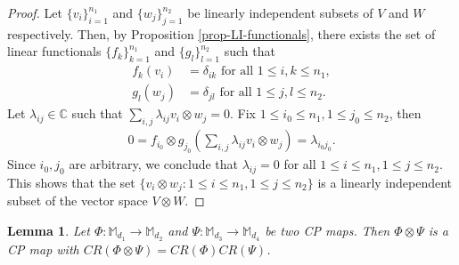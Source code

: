 \documentclass[10pt,reqno]{amsart}
\theoremstyle{definition}
\theoremstyle{plain}
\newtheorem{lem}[defn]{Lemma}
\theoremstyle{remark}
\newcommand{\mbb}[1]{\mathbb{#1}}
\newcommand{\msc}[1]{\mathscr{#1}}
\newcommand{\M}[1]{\mbb{M}_{#1}}%
\numberwithin{equation}{section}%
\begin{document}
   
   \begin{proof}
   	Let $\{v_i\}_{i=1}^{n_1}$ and $\{w_j\}_{j=1}^{n_2}$ be linearly independent subsets of $V$ and $W$ respectively. Then, by Proposition \ref{prop-LI-functionals}, there exists the set of linear functionals $\{f_k\}_{k=1}^{n_1}$ and $\{g_l\}_{l=1}^{n_2}$ such that 
   	\begin{align*}
   		f_k(v_i)&=\delta_{ik} \mbox{ for all } 1\leq i,k\leq n_1,\\
   		g_l(w_j)&=\delta_{jl} \mbox{ for all } 1\leq j,l\leq n_2.
   	\end{align*}
   	Let $\lambda_{ij}\in\mbb{C}$ such that $\sum_{i,j}\lambda_{ij}v_i\otimes w_j=0$. Fix $1\leq i_0\leq n_1, 1\leq j_0\leq n_2$, then 
   	\begin{align*}
   		0=f_{i_0}\otimes g_{j_0}\left(\sum_{i,j}\lambda_{ij}v_i\otimes w_j\right)=\lambda_{i_0j_0}.
   	\end{align*}
   	Since $i_0,j_0$ are arbitrary, we conclude that $\lambda_{ij}=0$ for all  $1\leq i\leq n_1, 1\leq j\leq n_2$. This shows that the set $\{v_i\otimes w_j: 1\leq i\leq n_1, 1\leq j\leq n_2\}$ is a linearly independent subset of the vector space $V\otimes W$.
   \end{proof}
   
   
   
   \begin{lem}\label{lem-product-Choirank}
   	Let $\Phi:\M{d_1}\to\M{d_2}$ and $\Psi:\M{d_3}\to\M{d_4}$ be two CP maps. Then $\Phi\otimes \Psi$ is a CP map with $CR(\Phi\otimes\Psi)=CR(\Phi)CR(\Psi)$.
   \end{lem}
   
   
   
\end{document}
